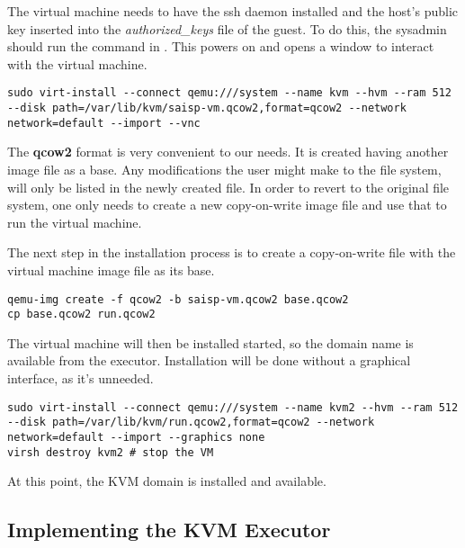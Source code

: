 The virtual machine needs to have the ssh daemon installed and the host's
public key inserted into the {\it authorized_keys} file of the guest. To do this,
the sysadmin should run the command in .
This powers on and opens a window to interact with the virtual machine.

\lstset{caption=Initial run of the virtual machine, label=lst:kvm-run}
\begin{lstlisting}
sudo virt-install --connect qemu:///system --name kvm --hvm --ram 512 --disk path=/var/lib/kvm/saisp-vm.qcow2,format=qcow2 --network network=default --import --vnc
\end{lstlisting}

The {\bf qcow2} format is very convenient to our needs. It is created having
another image file as a base. Any modifications the user might make to the
file system, will only be listed in the newly created file. In order to
revert to the original file system, one only needs to create a new
copy-on-write image file and use that to run the virtual machine.

The next step in the installation process is to create a copy-on-write file 
with the virtual machine image file as its base.

\lstset{caption=Creating the Target File, label=lst:kvm-base}
\begin{lstlisting}
qemu-img create -f qcow2 -b saisp-vm.qcow2 base.qcow2
cp base.qcow2 run.qcow2
\end{lstlisting}

The virtual machine will then be installed started, so the domain name is available
from the executor. Installation will be done without a graphical interface, 
as it's unneeded.


\lstset{caption=Install the KVM Domain, label=lst:kvm-install}
\begin{lstlisting}
sudo virt-install --connect qemu:///system --name kvm2 --hvm --ram 512 --disk path=/var/lib/kvm/run.qcow2,format=qcow2 --network network=default --import --graphics none
virsh destroy kvm2 # stop the VM
\end{lstlisting}

At this point, the KVM domain is installed and available.

\subsection{Implementing the KVM Executor}
\label{sub-sec:vmc-kvm-executor}

